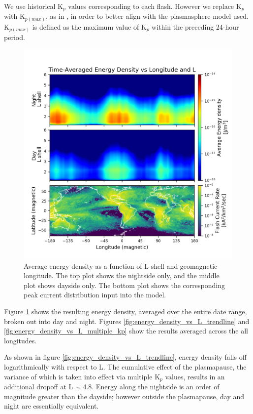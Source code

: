 We use historical K$_p$ values corresponding to each flash. However we replace K$_p$ with K$_{p(max)}$, as in \cite{Carpenter1992}, in order to better align with the plasmasphere model used. K$_{p(max)}$ is defined as the maximum value of K$_p$ within the preceding 24-hour period.

\begin{figure}[ht!]
\begin{center}
\includegraphics{figures/Energy_density_daynite.png}
\caption[Average energy density vs longitude and L]{Average energy density as a function of L-shell and geomagnetic longitude. The top plot shows the nightside only, and the middle plot shows dayside only. The bottom plot shows the corresponding peak current distribution input into the model.}
\label{fig:energy_density_daynite}
\end{center}
\end{figure}

Figure \ref{fig:energy_density_daynite} shows the resulting energy density, averaged over the entire date range, broken out into day and night. Figures \ref{fig:energy_density_vs_L_trendline} and \ref{fig:energy_density_vs_L_multiple_kp} show the results averaged across the all longitudes.

As shown in figure \ref{fig:energy_density_vs_L_trendline}, energy density falls off logarithmically with respect to L. The cumulative effect of the plasmapause, the variance of which is taken into effect via multiple K$_p$ values, results in an additional dropoff at L $\sim$ 4.8. Energy along the nightside is an order of magnitude greater than the dayside; however outside the plasmapause, day and night are essentially equivalent.

